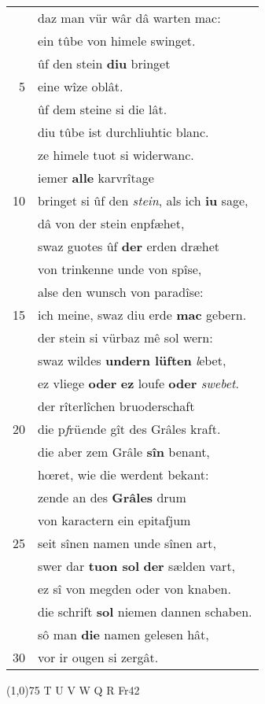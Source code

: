 \documentclass[8pt,a4paper,notitlepage]{article}
\begin{document}
\begin{table}[ht]
\begin{minipage}[t]{0.5\linewidth}
\begin{tabular}{rl}
 & daz man vür wâr dâ warten mac:\\ 
 & ein tûbe von himele swinget.\\ 
 & ûf den stein \textbf{diu} bringet\\ 
5 & eine wîze oblât.\\ 
 & ûf dem steine si die lât.\\ 
 & diu tûbe ist durchliuhtic blanc.\\ 
 & ze himele tuot si widerwanc.\\ 
 & iemer \textbf{alle} karvrîtage\\ 
10 & bringet si ûf den \textit{stein}, als ich \textbf{iu} sage,\\ 
 & dâ von der stein enpfæhet,\\ 
 & swaz guotes ûf \textbf{der} erden dræhet\\ 
 & von trinkenne unde von spîse,\\ 
 & alse den wunsch von paradîse:\\ 
15 & ich meine, swaz diu erde \textbf{mac} gebern.\\ 
 & der stein si vürbaz mê sol wern:\\ 
 & swaz wildes \textbf{undern lüften} \textit{l}ebet,\\ 
 & ez vliege \textbf{oder} \textbf{ez} loufe \textbf{oder} \textit{swebet}.\\ 
 & der rîterlîchen bruoderschaft\\ 
20 & die p\textit{f}rü\textit{e}nde gît des Grâles kraft.\\ 
 & die aber zem Grâle \textbf{sîn} benant,\\ 
 & hœret, wie die werdent bekant:\\ 
 & zende an des \textbf{Grâles} drum\\ 
 & von karactern ein epitafjum\\ 
25 & seit sînen namen unde sînen art,\\ 
 & swer dar \textbf{tuon sol} \textbf{der} sælden vart,\\ 
 & ez sî von megden oder von knaben.\\ 
 & die schrift \textbf{sol} niemen dannen schaben.\\ 
 & sô man \textbf{die} namen gelesen hât,\\ 
30 & vor ir ougen si zergât.\\ 
\end{tabular}
\scriptsize
\line(1,0){75} \newline
T U V W Q R Fr42 \newline

\end{minipage}
\end{table}
\end{document}
